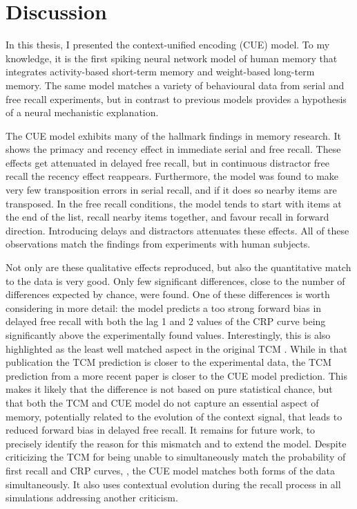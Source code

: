 \chapter{Discussion}
In this thesis, I presented the context-unified encoding (CUE) model.
To my knowledge, it is the first spiking neural network model of human memory that integrates activity-based short-term memory and weight-based long-term memory.
The same model matches a variety of behavioural data from serial and free recall experiments, but in contrast to previous models provides a hypothesis of a neural mechanistic explanation.

The CUE model exhibits many of the hallmark findings in memory research.
It shows the primacy and recency effect in immediate serial and free recall.
These effects get attenuated in delayed free recall, but in continuous distractor free recall the recency effect reappears.
Furthermore, the model was found to make very few transposition errors in serial recall, and if it does so nearby items are transposed.
In the free recall conditions, the model tends to start with items at the end of the list, recall nearby items together, and favour recall in forward direction.
Introducing delays and distractors attenuates these effects.
All of these observations match the findings from experiments with human subjects.

Not only are these qualitative effects reproduced, but also the quantitative match to the data is very good.
Only few significant differences, close to the number of differences expected by chance, were found.
One of these differences is worth considering in more detail: the model predicts a too strong forward bias in delayed free recall with both the lag \num{1} and \num{2} values of the CRP curve being significantly above the experimentally found values.
Interestingly, this is also highlighted as the least well matched aspect in the original TCM \parencite{Howard2002}.
While in that publication the TCM prediction is closer to the experimental data, the TCM prediction from a more recent paper \parencite{Sederberg2008} is closer to the CUE model prediction.
This makes it likely that the difference is not based on pure statistical chance, but that both the TCM and CUE model do not capture an essential aspect of memory, potentially related to the evolution of the context signal, that leads to reduced forward bias in delayed free recall.
It remains for future work, to precisely identify the reason for this mismatch and to extend the model.
Despite \textcite{farrell2008-1} criticizing the TCM for being unable to simultaneously match the probability of first recall and CRP curves, \parencite[but see][]{howard2009}, the CUE model matches both forms of the data simultaneously.
It also uses contextual evolution during the recall process in all simulations addressing another criticism.

